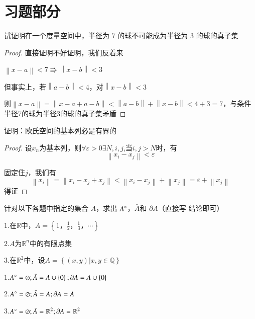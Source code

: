 \documentclass[lang=cn,10pt]{elegantbook}
\begin{document}
\section{习题部分}
\begin{exercise}
	试证明在一个度量空间中，半径为 7 的球不可能成为半径为
	3 的球的真子集
\end{exercise}
\begin{proof}
	直接证明不好证明，我们反着来
	
	$\left\| x-a \right\| <7\Rrightarrow \left\| x-b \right\| <3$
	
	但事实上，若$\left\| a-b \right\| <4$，对$\left\| x-b \right\|<3$ 
	
	则$\left\| x-a \right\| =\left\| x-a+a-b \right\| <\left\| a-b \right\| +\left\| x-b \right\| <4+3=7$，与条件半径7的球为半径3的球的真子集矛盾
\end{proof}
\begin{exercise}
	证明：欧氏空间的基本列必是有界的
\end{exercise}
\begin{proof}
	设$x_{n}$为基本列，则$\forall \varepsilon >0 \exists N,i,j$,当$i,j>N$时，有
	\begin{equation*}
		\left\| x_i-x_j \right\| <\varepsilon 
	\end{equation*}

	固定住$j$，我们有
	\begin{equation*}
		\left\| x_i \right\| =\left\| x_i-x_j+x_j \right\| <\left\| x_i-x_j \right\| +\left\| x_j \right\| =\varepsilon +\left\| x_j \right\| 
	\end{equation*}
	得证
\end{proof}
\begin{exercise}
	针对以下各题中指定的集合 $A$，求出 $A\degree$，$\bar{A}$和 $\partial 	A$（直接写
	结论即可）
	
	1.$\text{在}\mathbb{R} \text{中，}A=\left\{ 1\text{，}\frac{1}{2}\text{，}\frac{1}{3}\text{，}\cdots \right\} $
	
	2.$A\text{为}\mathbb{R} ^n\text{中的有限点集}$
	
	3.$\text{在}\mathbb{R} ^2\text{中，设}A=\left\{ \left( x,y \right) |x,y\in \mathbb{Q} \right\} $
\end{exercise}
\begin{solution}
	
	1.$A\degree=\oslash ;\bar{A}=A \cup \left\{ 0 \right\} ;\partial A=A\cup \left\{ 0 \right\} $
	
	2.$A\degree=\oslash ;\bar{A}=A ;\partial A=A$
	
	3.$A\degree=\oslash ;\bar{A}=\mathbb{R} ^2;\partial A=\mathbb{R} ^2$
\end{solution}
\end{document}
